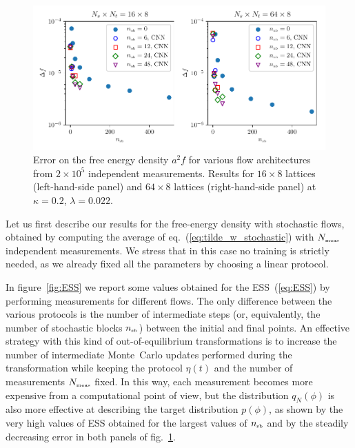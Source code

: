 \documentclass[11pt]{article}
\newcommand{\nsb}{n_{\mbox{\tiny{sb}}}}
\newcommand{\nmeas}{N_{\mbox{\tiny{meas}}}}
\begin{document}
\begin{figure}[!htb]
\begin{center}
\includegraphics*[width=\textwidth]{error.pdf}
\caption{\label{fig:f_error} Error on the free energy density $a^2 f$ for various flow architectures from $2 \times 10^5$ independent measurements. Results for $16\times8$ lattices (left-hand-side panel) and $64 \times 8$ lattices (right-hand-side panel) at $\kappa=0.2$, $\lambda=0.022$.}
\end{center}
\end{figure}

Let us first describe our results for the free-energy density with stochastic flows, obtained by computing the average of eq.~(\ref{eq:tilde_w_stochastic}) with $\nmeas$ independent measurements. We stress that in this case no training is strictly needed, as we already fixed all the parameters by choosing a linear protocol.

In figure~\ref{fig:ESS} we report some values obtained for the ESS~(\ref{eq:ESS}) by performing measurements for different flows. The only difference between the various protocols is the number of intermediate steps (or, equivalently, the number of stochastic blocks $\nsb$) between the initial and final points. An effective strategy with this kind of out-of-equilibrium transformations is to increase the number of intermediate Monte~Carlo updates performed during the transformation while keeping the protocol $\eta(t)$ and the number of measurements $\nmeas$ fixed. In this way, each measurement becomes more expensive from a computational point of view, but the distribution $q_N(\phi)$ is also more effective at describing the target distribution $p(\phi)$, as shown by the very high values of ESS obtained for the largest values of $\nsb$ and by the steadily decreasing error in both panels of fig.~\ref{fig:f_error}.
\end{document}
